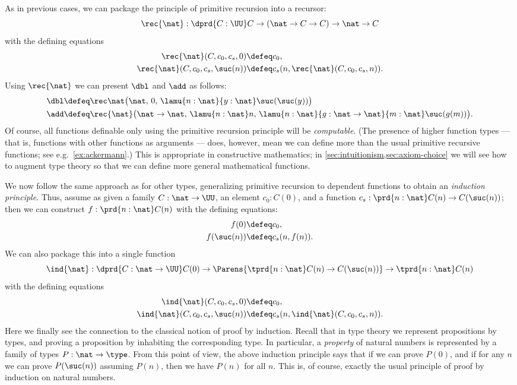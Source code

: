 As in previous cases, we can package the principle of primitive recursion into a recursor:
\[\rec{\nat}  : \dprd{C:\UU} C \to (\nat \to C \to C) \to \nat \to C \]
with the defining equations
%
\begin{align*}
\rec{\nat}(C,c_0,c_s,0)  &\defeq c_0, \\
\rec{\nat}(C,c_0,c_s,\suc(n)) &\defeq c_s(n,\rec{\nat}(C,c_0,c_s,n)).
\end{align*}
Using $\rec{\nat}$ we can present $\dbl$ and $\add$ as follows:
\begin{align}
\dbl &\defeq \rec\nat\big(\nat,\, 0,\, \lamu{n:\nat}{y:\nat} \suc(\suc(y))\big) \label{eq:dbl-as-rec}\\
\add &\defeq \rec{\nat}\big(\nat \to \nat,\, \lamu{n:\nat} n,\, \lamu{n:\nat}{g:\nat \to \nat}{m :\nat} \suc(g(m))\big).
\end{align}
Of course, all functions definable only using the primitive recursion principle will be \emph{computable}.
(The presence of higher function types --- that is, functions with other functions as arguments --- does, however, mean we can define more than the usual primitive recursive functions; see e.g.~\cref{ex:ackermann}.)
This is appropriate in constructive mathematics;
%
in \cref{sec:intuitionism,sec:axiom-choice} we will see how to augment type theory so that we can define more general mathematical functions.

We now follow the same approach as for other types, generalizing primitive recursion to dependent functions to obtain an \emph{induction principle}.
Thus, assume as given a family $C : \nat \to \UU$, an element $c_0 : C(0)$, and a function $c_s : \prd{n:\nat} C(n) \to C(\suc(n))$; then we can construct $f : \prd{n:\nat} C(n)$ with the defining equations:
\begin{align*}
  f(0) &\defeq c_0, \\
  f(\suc(n)) &\defeq c_s(n,f(n)).
\end{align*}
We can also package this into a single function
%
\[\ind{\nat}  : \dprd{C:\nat\to \UU} C(0) \to \Parens{\tprd{n : \nat} C(n) \to C(\suc(n))} \to \tprd{n : \nat} C(n) \]
with the defining equations
\begin{align*}
\ind{\nat}(C,c_0,c_s,0)  &\defeq c_0, \\
\ind{\nat}(C,c_0,c_s,\suc(n)) &\defeq c_s(n,\ind{\nat}(C,c_0,c_s,n)).
\end{align*}
Here we finally see the connection to the classical notion of proof by induction.
Recall that in type theory we represent propositions by types, and proving a proposition by inhabiting the corresponding type.
In particular, a \emph{property} of natural numbers is represented by a family of types $P:\nat\to\type$.
From this point of view, the above induction principle says that if we can prove $P(0)$, and if for any $n$ we can prove $P(\suc(n))$ assuming $P(n)$, then we have $P(n)$ for all $n$.
This is, of course, exactly the usual principle of proof by induction on natural numbers.

